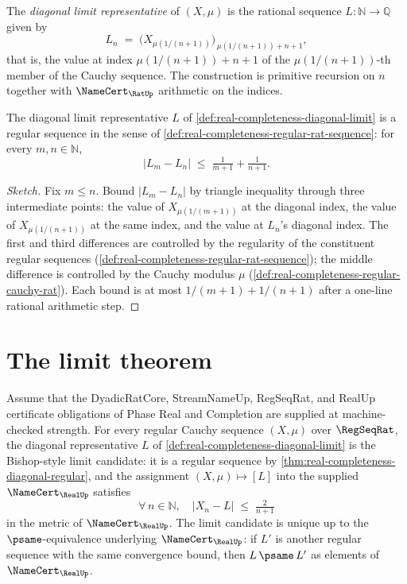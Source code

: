 \begin{definition}
\label{def:real-completeness-diagonal-limit}
The \emph{diagonal limit representative} of $(X, \mu)$ is the rational sequence $L \colon \mathbb{N} \to \mathbb{Q}$ given by
$$ L_n \;=\; \big(X_{\mu(1/(n+1))}\big)_{\,\mu(1/(n+1)) + n + 1}, $$
that is, the value at index $\mu(1/(n+1)) + n + 1$ of the $\mu(1/(n+1))$-th member of the Cauchy sequence. The construction is primitive recursion on $n$ together with $\NameCert_{\RatUp}$ arithmetic on the indices.
\end{definition}

\begin{theorem}
\label{thm:real-completeness-diagonal-regular}
The diagonal limit representative $L$ of \autoref{def:real-completeness-diagonal-limit} is a regular sequence in the sense of \autoref{def:real-completeness-regular-rat-sequence}: for every $m, n \in \mathbb{N}$,
$$ |L_m - L_n| \;\le\; \tfrac{1}{m+1} + \tfrac{1}{n+1}. $$
\end{theorem}

\begin{proof}[Sketch]
Fix $m \le n$. Bound $|L_m - L_n|$ by triangle inequality through three intermediate points: the value of $X_{\mu(1/(m+1))}$ at the diagonal index, the value of $X_{\mu(1/(n+1))}$ at the same index, and the value at $L_n$'s diagonal index. The first and third differences are controlled by the regularity of the constituent regular sequences (\autoref{def:real-completeness-regular-rat-sequence}); the middle difference is controlled by the Cauchy modulus $\mu$ (\autoref{def:real-completeness-regular-cauchy-rat}). Each bound is at most $1/(m+1) + 1/(n+1)$ after a one-line rational arithmetic step.
\end{proof}

\section{The limit theorem}
\label{sec:real-completeness-limit-theorem}

\begin{theorem}
\label{thm:real-completeness-limit-exists-unique}
Assume that the DyadicRatCore, StreamNameUp, RegSeqRat, and RealUp certificate obligations of Phase Real and Completion are supplied at machine-checked strength. For every regular Cauchy sequence $(X, \mu)$ over $\RegSeqRat$, the diagonal representative $L$ of \autoref{def:real-completeness-diagonal-limit} is the Bishop-style limit candidate: it is a regular sequence by \autoref{thm:real-completeness-diagonal-regular}, and the assignment $(X, \mu) \mapsto [L]$ into the supplied $\NameCert_{\RealUp}$ satisfies
$$ \forall\, n \in \mathbb{N}, \quad |X_n - L| \;\le\; \tfrac{2}{n+1} $$
in the metric of $\NameCert_{\RealUp}$. The limit candidate is unique up to the $\psame$-equivalence underlying $\NameCert_{\RealUp}$: if $L'$ is another regular sequence with the same convergence bound, then $L \,\psame\, L'$ as elements of $\NameCert_{\RealUp}$.
\end{theorem}

